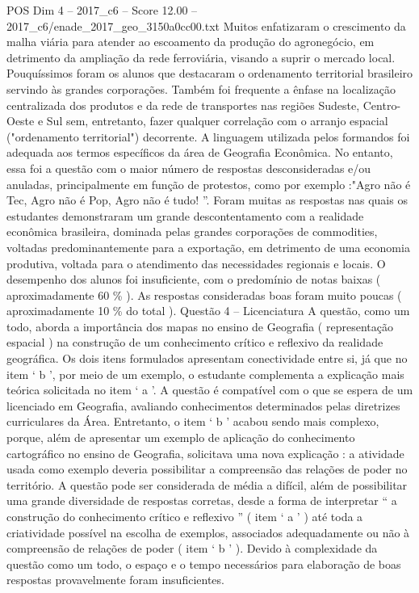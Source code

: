 \begin{textsample}{POS Dim 4 – 2017\_c6 – Score 12.00 – 2017\_c6/enade\_2017\_geo\_3150a0cc00.txt}
Muitos enfatizaram o crescimento da malha viária para atender ao escoamento da produção do agronegócio, em detrimento da ampliação da rede ferroviária, visando a suprir o mercado local.
Pouquíssimos foram os alunos que destacaram o ordenamento territorial brasileiro servindo às grandes corporações.
Também foi frequente a ênfase na localização centralizada dos produtos e da rede de transportes nas regiões Sudeste, Centro-Oeste e Sul sem, entretanto, fazer qualquer correlação com o arranjo espacial ("ordenamento territorial") decorrente.
A linguagem utilizada pelos formandos foi adequada aos termos específicos da área de Geografia Econômica.
No entanto, essa foi a questão com o maior número de respostas desconsideradas e/ou anuladas, principalmente em função de protestos, como por exemplo :"Agro não é Tec, Agro não é Pop, Agro não é tudo! ”.
Foram muitas as respostas nas quais os estudantes demonstraram um grande descontentamento com a realidade econômica brasileira, dominada pelas grandes corporações de commodities, voltadas predominantemente para a exportação, em detrimento de uma economia produtiva, voltada para o atendimento das necessidades regionais e locais.
O desempenho dos alunos foi insuficiente, com o predomínio de notas baixas ( aproximadamente 60 \% ).
As respostas consideradas boas foram muito poucas ( aproximadamente 10 \% do total ).
Questão 4 – Licenciatura A questão, como um todo, aborda a importância dos mapas no ensino de Geografia ( representação espacial ) na construção de um conhecimento crítico e reflexivo da realidade geográfica.
Os dois itens formulados apresentam conectividade entre si, já que no item ‘ b ’, por meio de um exemplo, o estudante complementa a explicação mais teórica solicitada no item ‘ a ’.
A questão é compatível com o que se espera de um licenciado em Geografia, avaliando conhecimentos determinados pelas diretrizes curriculares da Área.
Entretanto, o item ‘ b ’ acabou sendo mais complexo, porque, além de apresentar um exemplo de aplicação do conhecimento cartográfico no ensino de Geografia, solicitava uma nova explicação : a atividade usada como exemplo deveria possibilitar a compreensão das relações de poder no território.
A questão pode ser considerada de média a difícil, além de possibilitar uma grande diversidade de respostas corretas, desde a forma de interpretar “ a construção do conhecimento crítico e reflexivo ” ( item ‘ a ’ ) até toda a criatividade possível na escolha de exemplos, associados adequadamente ou não à compreensão de relações de poder ( item ‘ b ’ ).
Devido à complexidade da questão como um todo, o espaço e o tempo necessários para elaboração de boas respostas provavelmente foram insuficientes.

\end{textsample}
